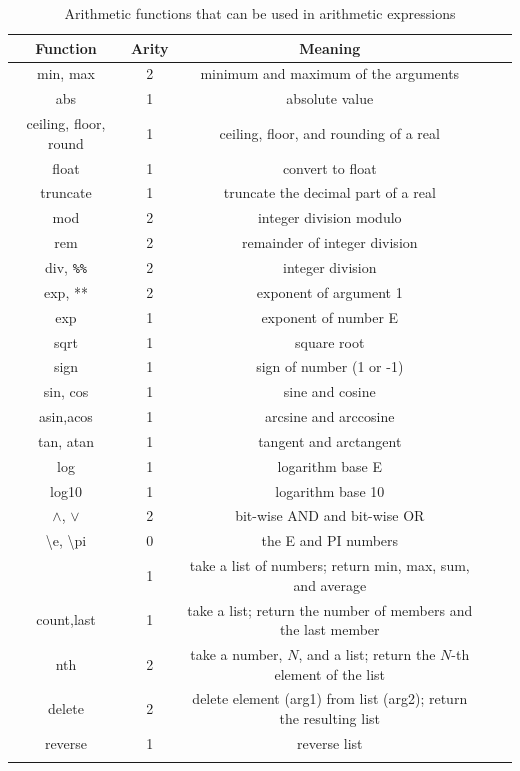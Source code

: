 \documentclass[11pt]{article}
\newcommand{\bs}{\textbackslash}
\begin{document}
\begin{table}[tbh]
  \center
{ \footnotesize
\begin{tabular}{|c|c|c|c|c|}
\hline
Function  & Arity & Meaning  \\ \hline
min, max & 2 & minimum and maximum of the arguments\\
abs & 1 & absolute value \\
ceiling, floor, round & 1 & ceiling, floor, and rounding of a real \\
float & 1 & convert to float \\
truncate & 1 & truncate the decimal part of a real \\
mod & 2 & integer division modulo \\
rem & 2 & remainder of integer division\\
div, \texttt{\%\%} & 2 & integer division\\
exp, ** & 2 & exponent of argument 1\\
exp & 1 & exponent of number E\\
sqrt & 1 & square root\\
sign & 1 & sign of number (1 or -1)\\
sin, cos & 1 & sine and cosine \\
asin,acos & 1 & arcsine and arccosine\\ 
tan, atan & 1 & tangent and arctangent \\
log & 1 & logarithm base E \\
log10 & 1 & logarithm base 10 \\
$\wedge$, $\vee$ & 2 & bit-wise AND and bit-wise OR \\
\bs{}e, \bs{}pi & 0 & the E and PI numbers\\
\ifdef{\isfloraman}{}
{
  min,max,sum,avg & 1 & take a list of numbers; return min, max, sum, and
  average
  \\
  count,last & 1 & take a list; return the number of members and the last
  member
  \\
  nth & 2 & take a number, $N$, and a list; return the $N$-th element of
  the list
  \\
  delete & 2 & delete element (arg1) from list (arg2); return the resulting list
  \\
  reverse & 1& reverse list
  \\
}
\hline
\end{tabular}
}
\caption{Arithmetic functions that can be used in arithmetic expressions}
\label{tab:arith-funcs}
\end{table}
\end{document}
